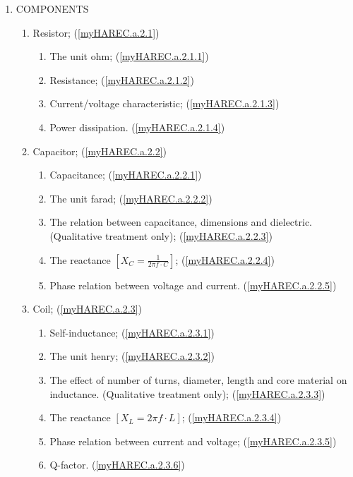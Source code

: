 \begin{enumerate}
\item COMPONENTS
\begin{enumerate}[noitemsep]
\item Resistor; (\ref{myHAREC.a.2.1})\label{HAREC.a.2.1}
\begin{enumerate}[noitemsep]
\item The unit ohm; (\ref{myHAREC.a.2.1.1})\label{HAREC.a.2.1.1}
\item Resistance; (\ref{myHAREC.a.2.1.2})\label{HAREC.a.2.1.2}
\item Current/voltage characteristic; (\ref{myHAREC.a.2.1.3})\label{HAREC.a.2.1.3}
\item Power dissipation. (\ref{myHAREC.a.2.1.4})\label{HAREC.a.2.1.4}
\end{enumerate}
\item Capacitor; (\ref{myHAREC.a.2.2})\label{HAREC.a.2.2}
\begin{enumerate}[noitemsep]
\item Capacitance; (\ref{myHAREC.a.2.2.1})\label{HAREC.a.2.2.1}
\item The unit farad; (\ref{myHAREC.a.2.2.2})\label{HAREC.a.2.2.2}
\item The relation between capacitance, dimensions and dielectric. (Qualitative treatment only); (\ref{myHAREC.a.2.2.3})\label{HAREC.a.2.2.3}
\item The reactance \(\left[X_C = \frac{1}{2\pi f \cdot C}\right]\); (\ref{myHAREC.a.2.2.4})\label{HAREC.a.2.2.4}
\item Phase relation between voltage and current. (\ref{myHAREC.a.2.2.5})\label{HAREC.a.2.2.5}
\end{enumerate}
\item Coil; (\ref{myHAREC.a.2.3})\label{HAREC.a.2.3}
\begin{enumerate}[noitemsep]
\item Self-inductance; (\ref{myHAREC.a.2.3.1})\label{HAREC.a.2.3.1}
\item The unit henry; (\ref{myHAREC.a.2.3.2})\label{HAREC.a.2.3.2}
\item The effect of number of turns, diameter, length and core material on inductance. (Qualitative treatment only); (\ref{myHAREC.a.2.3.3})\label{HAREC.a.2.3.3}
\item The reactance  \(\left[X_L = 2\pi f \cdot L\right]\); (\ref{myHAREC.a.2.3.4})\label{HAREC.a.2.3.4}
\item Phase relation between current and voltage; (\ref{myHAREC.a.2.3.5})\label{HAREC.a.2.3.5}
\item Q-factor. (\ref{myHAREC.a.2.3.6})\label{HAREC.a.2.3.6}

\end{enumerate}
\end{enumerate}
\end{enumerate}
